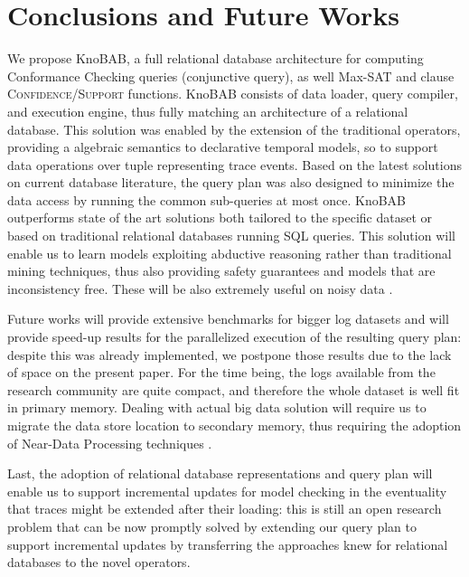 \section{Conclusions and Future Works}
We propose KnoBAB, a full relational database architecture for computing Conformance Checking queries (conjunctive query), as well Max-SAT and clause \textsc{Confidence}/\textsc{Support} functions.  KnoBAB consists of data loader, query compiler, and execution engine, thus fully matching an architecture of a relational database. This solution was enabled by the extension of the traditional \LTLf operators, providing a algebraic semantics to declarative temporal models, so to support data operations over tuple representing trace  events. Based on the latest solutions on current database literature, the query plan was also designed to minimize the data access by running the common sub-queries at most once.
%
KnoBAB outperforms state of the art solutions both tailored to the specific dataset or based on traditional relational databases running SQL queries.  This solution will enable us to learn models exploiting abductive reasoning rather than traditional mining techniques, thus also providing safety guarantees and models that are inconsistency free. These will be also extremely useful on  noisy data \cite{PicadoDTL20}.

Future works will provide extensive benchmarks for bigger log datasets and will provide speed-up results for the parallelized execution of the resulting query plan: despite this was already implemented, we postpone those results due to the lack of space on the present paper. For the time being, the logs available from the research community are quite compact, and therefore the whole dataset is well fit in primary memory. Dealing with actual big data solution will require us to migrate the data store location to secondary memory, thus requiring the adoption of Near-Data Processing techniques \cite{GuYBJLYKKYCJC16}. 

Last, %
the adoption of relational database representations and query plan will enable us to support incremental updates for model checking in the eventuality that traces might be extended after their loading: this is still an open research problem \cite{Polyvyanyy2022} that can be now promptly solved by extending our query plan to support incremental updates by transferring the approaches knew for relational databases to the novel \xLTLf operators. 

